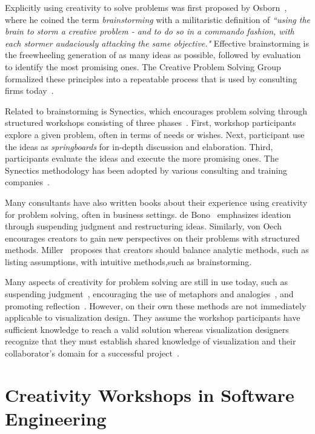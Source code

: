 Explicitly using creativity to solve problems was first proposed by Osborn~\cite{Osborn1953}, where he coined the term \emph{brainstorming} with a militaristic definition of \emph{``using the \emph{brain} to \emph{storm} a creative problem - and to do so in a commando fashion, with each stormer audaciously attacking the same objective."} Effective brainstorming is the freewheeling generation of as many ideas as possible, followed by evaluation to identify the most promising ones. The Creative Problem Solving Group formalized these principles into a repeatable process that is used by consulting firms today~\cite{Isaksen2000}.

Related to brainstorming is Synectics, which encourages problem solving through structured workshops consisting of three phases~\cite{Gordon1961}. First, workshop participants explore a given problem, often in terms of needs or wishes. Next, participant use the ideas as \emph{springboards} for in-depth discussion and elaboration. Third, participants evaluate the ideas and execute the more promising ones. The Synectics methodology has been adopted by various consulting and training companies~\cite{Nolan2003}.

Many consultants have also written books about their experience using creativity for problem solving, often in business settings. de Bono~\cite{DeBono1983} emphasizes ideation through suspending judgment and restructuring ideas. Similarly, von Oech~\cite{VonOech1986,VonOech1988} encourages creators to gain new perspectives on their problems with structured methods. Miller~\cite{Miller1989} proposes that creators should balance analytic methods, such as listing assumptions, with intuitive methods,such as brainstorming.

Many aspects of creativity for problem solving are still in use today, such as suspending judgment~\cite{Osborn1953}, encouraging the use of metaphors and analogies~\cite{Gordon1961}, and promoting reflection~\cite{DeBono1983}. However, on their own these methods are not immediately applicable to visualization design. They assume the workshop participants have sufficient knowledge to reach a valid solution whereas visualization designers recognize that they must establish shared knowledge of visualization and their collaborator's domain for a successful project~\cite{Wijk2006}. 

\section{Creativity Workshops in Software Engineering}

